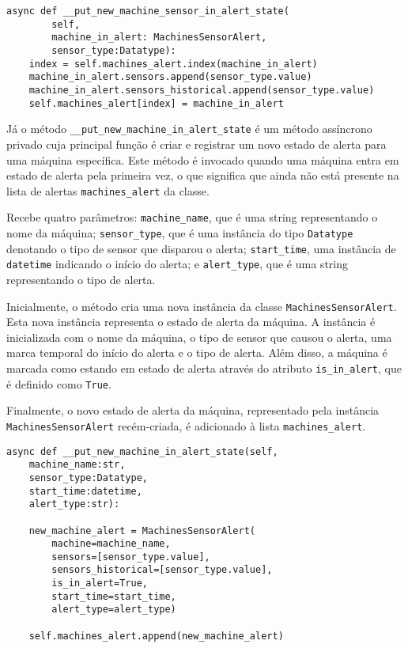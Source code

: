 \begin{verbatim}
async def __put_new_machine_sensor_in_alert_state(
        self,
        machine_in_alert: MachinesSensorAlert,
        sensor_type:Datatype):
    index = self.machines_alert.index(machine_in_alert)
    machine_in_alert.sensors.append(sensor_type.value)
    machine_in_alert.sensors_historical.append(sensor_type.value)
    self.machines_alert[index] = machine_in_alert
\end{verbatim}

Já o método \texttt{\_\_put\_new\_machine\_in\_alert\_state} é um método assíncrono privado cuja principal função é criar e registrar um novo estado de alerta para uma máquina específica. Este método é invocado quando uma máquina entra em estado de alerta pela primeira vez, o que significa que ainda não está presente na lista de alertas \texttt{machines\_alert} da classe.

Recebe quatro parâmetros: \texttt{machine\_name}, que é uma string representando o nome da máquina; \texttt{sensor\_type}, que é uma instância do tipo \texttt{Datatype} denotando o tipo de sensor que disparou o alerta; \texttt{start\_time}, uma instância de \texttt{datetime} indicando o início do alerta; e \texttt{alert\_type}, que é uma string representando o tipo de alerta.

Inicialmente, o método cria uma nova instância da classe \texttt{MachinesSensorAlert}. Esta nova instância representa o estado de alerta da máquina. A instância é inicializada com o nome da máquina, o tipo de sensor que causou o alerta, uma marca temporal do início do alerta e o tipo de alerta. Além disso, a máquina é marcada como estando em estado de alerta através do atributo \texttt{is\_in\_alert}, que é definido como \texttt{True}.

Finalmente, o novo estado de alerta da máquina, representado pela instância \texttt{MachinesSensorAlert} recém-criada, é adicionado à lista \texttt{machines\_alert}.

\begin{verbatim}
async def __put_new_machine_in_alert_state(self,
    machine_name:str,
    sensor_type:Datatype,
    start_time:datetime,
    alert_type:str):

    new_machine_alert = MachinesSensorAlert(
        machine=machine_name,
        sensors=[sensor_type.value],
        sensors_historical=[sensor_type.value],
        is_in_alert=True,
        start_time=start_time,
        alert_type=alert_type)

    self.machines_alert.append(new_machine_alert)
\end{verbatim}


